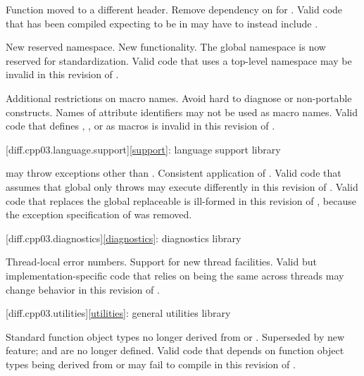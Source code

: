 \change
Function  moved to a different header.
\rationale
Remove dependency on  for .
\effect
Valid \CppIII{} code that has been compiled expecting  to be in
 may have to instead include .

\change
New reserved namespace.
\rationale
New functionality.
\effect
The global namespace  is now reserved for standardization. Valid
\CppIII{} code that uses a top-level namespace  may be invalid in
this revision of \Cpp{}.

\change
Additional restrictions on macro names.
\rationale
Avoid hard to diagnose or non-portable constructs.
\effect
Names of attribute identifiers may not be used as macro names. Valid \CppIII{}
code that defines , , or
 as macros is invalid in this
revision of \Cpp{}.

[diff.cpp03.language.support]{\ref{support}:
language support library}

\change
{} may throw exceptions other than
.
\rationale
Consistent application of .
\effect
Valid \CppIII{} code that assumes that global  only
throws  may execute differently in this revision of \Cpp{}.
Valid \CppIII{} code that replaces the global replaceable 
is ill-formed in this revision of \Cpp{},
because the exception specification of 
was removed.

[diff.cpp03.diagnostics]{\ref{diagnostics}: diagnostics library}

\change
Thread-local error numbers.
\rationale
Support for new thread facilities.
\effect
Valid but implementation-specific \CppIII{} code that relies on
 being the same across threads may change behavior in this
revision of \Cpp{}.

[diff.cpp03.utilities]{\ref{utilities}: general utilities library}

\change
Standard function object types no longer derived from
 or .
\rationale
Superseded by new feature;  and
 are no longer defined.
\effect
Valid \CppIII{} code that depends on function object types being derived from
 or  may fail to compile
in this revision of \Cpp{}.

